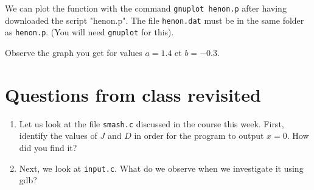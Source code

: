 \documentclass[11pt]{article}
\begin{document}
We can plot the function with the command \texttt{gnuplot henon.p} after having downloaded the script "henon.p". The file \texttt{henon.dat} must be in the same folder as \texttt{henon.p}. (You will need \texttt{gnuplot} for this).

Observe the graph you get for values \( a = 1.4 \) et \( b = -0.3 \).

\section{Questions from class revisited}

\begin{enumerate}
	\item Let us look at the file \texttt{smash.c} discussed in the course this week. First, identify the values of $J$ and $D$ in order for the program to output $x=0$. How did you find it? 
	\item Next, we look at \texttt{input.c}. What do we observe when we investigate it using gdb?
 \end{enumerate}
\end{document}

